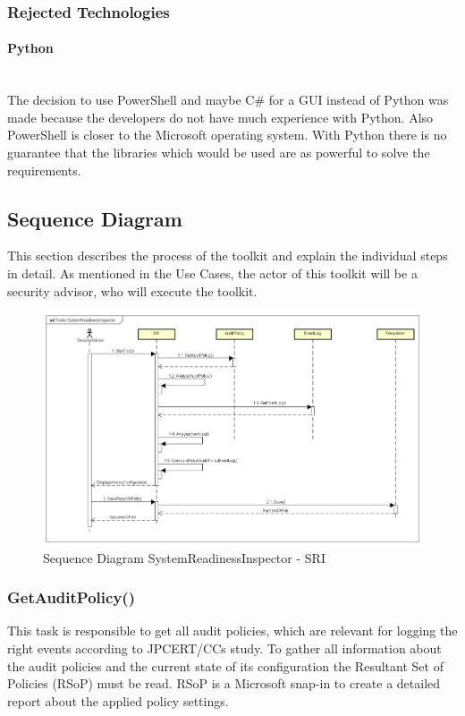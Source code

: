 \subsubsection{Rejected Technologies}

\paragraph{Python}\ \\
The decision to use PowerShell and maybe C\# for a GUI instead of Python was made because the developers do not have much experience with Python. Also PowerShell is closer to the Microsoft operating system. With Python there is no guarantee that the libraries which would be used are as powerful to solve the requirements.


\subsection{Sequence Diagram}
This section describes the process of the toolkit and explain the individual steps in detail. As mentioned in the Use Cases, the actor of this toolkit will be a security advisor, who will execute the toolkit.

\begin{figure}[H]
    \centering
    \includegraphics[width=1\linewidth]{assets/design-tool/SequenceDiagramSRI.png}
    \caption{Sequence Diagram SystemReadinessInspector - SRI}
\end{figure}

\clearpage

\subsubsection{GetAuditPolicy()}
This task is responsible to get all audit policies, which are relevant for logging the right events according to JPCERT/CCs study. To gather all information about the audit policies and the current state of its configuration  the Resultant Set of Policies (RSoP) \cite{RSoP} must be read. RSoP is a Microsoft snap-in to create a detailed report about the applied policy settings. 

